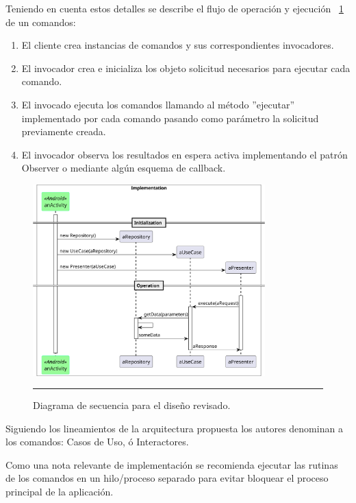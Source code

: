 Teniendo en cuenta estos detalles se describe el flujo de operación y ejecución ~\ref{fig:uml_commander_sequence_req_resp} de un comandos:

\begin{enumerate}
	\item El cliente crea instancias de comandos y sus correspondientes invocadores. 
	\item El invocador crea e inicializa los objeto solicitud necesarios para ejecutar cada comando.
	\item El invocado ejecuta los comandos llamando al método ''ejecutar'' implementado por cada comando pasando como parámetro la solicitud previamente creada.
	\item El invocador observa los resultados en espera activa implementando el patrón Observer o mediante algún esquema de callback.
\end{enumerate}



\begin{figure}[htbp]
	\centering
	\includegraphics[width=0.8\textwidth]{Figures/design/SEQ_command_app.png}
	\rule{35em}{1pt}
	\caption[Commander Review]{Diagrama de secuencia para el diseño revisado.}
	\label{fig:uml_commander_sequence_req_resp}
\end{figure}

Siguiendo los lineamientos de la arquitectura propuesta los autores denominan a los comandos: Casos de Uso, ó Interactores.

Como una nota relevante de implementación se recomienda ejecutar las rutinas de los comandos en un hilo/proceso separado para evitar bloquear el proceso principal de la aplicación.

